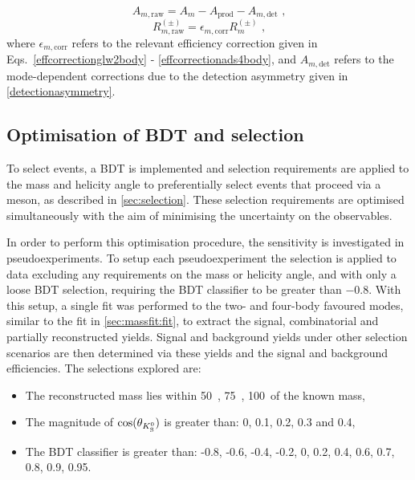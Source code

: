 \begin{equation}
A_{m, \text{raw}} = A_m - A_{\text{prod}} - A_{m, \text{det}} \text{ ,}
\end{equation}
\begin{equation}
R_{m, \text{raw}}^{(\pm)} = \epsilon_{m, \text{corr}}R_m^{(\pm)} \text{ ,}
\end{equation}
where $\epsilon_{m, \text{corr}}$ refers to the relevant efficiency correction given in Eqs.~\ref{effcorrectionglw2body} - \ref{effcorrectionads4body}, and $A_{m, \text{det}}$ refers to the mode-dependent corrections due to the detection asymmetry given in \tab\ref{detectionasymmetry}.

\subsection{Optimisation of BDT and \Kstar selection}
\label{sec:cpfit:optimisation}

To select \btodkst events, a BDT is implemented and selection requirements are applied to the \Kstarm mass and \KS helicity angle to preferentially select events that proceed via a \Kstarm meson, as described in \sect\ref{sec:selection}. These selection requirements are optimised simultaneously with the aim of minimising the uncertainty on the \CP observables. 

In order to perform this optimisation procedure, the sensitivity is investigated in pseudoexperiments. To setup each pseudoexperiment the selection is applied to data excluding any requirements on the \Kstarm mass or \KS helicity angle, and with only a loose BDT selection, requiring the BDT classifier to be greater than $-0.8$. With this setup, a single fit was performed to the two- and four-body favoured modes, similar to the fit in \sect\ref{sec:massfit:fit}, to extract the signal, combinatorial and partially reconstructed yields. Signal and background yields under other selection scenarios are then determined via these yields and the signal and background efficiencies. The selections explored are:

\begin{itemize}
\item{The reconstructed \Kstarm mass lies within 50~\mevcc, 75~\mevcc, 100~\mevcc of the known \Kstarm mass,}
\item{The magnitude of $\cos(\theta_{{{K}^0_{\mathrm{ \scriptscriptstyle S}}}})$ is greater than: 0, 0.1, 0.2, 0.3 and 0.4,}
\item{The BDT classifier is greater than: -0.8, -0.6, -0.4, -0.2, 0, 0.2, 0.4, 0.6, 0.7, 0.8, 0.9, 0.95.}
\end{itemize}

